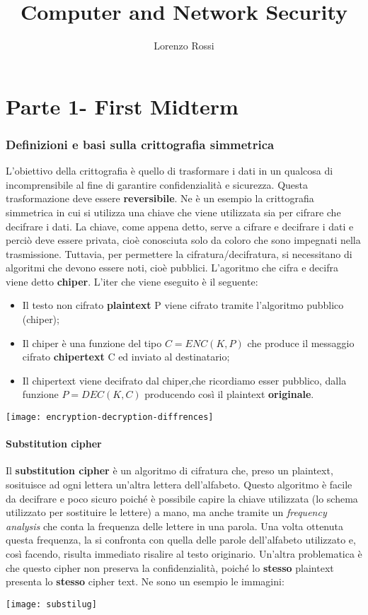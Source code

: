 \documentclass{article}
\title{Computer and Network Security}
\author{Lorenzo Rossi}
\theoremstyle{remark}
\begin{document}
\theoremstyle{definition}

\maketitle

\tableofcontents
\newpage
\part{Parte 1- First Midterm}
\section{Definizioni e basi sulla crittografia simmetrica}
L'obiettivo della crittografia è quello di trasformare i dati in un qualcosa di incomprensibile al fine di garantire confidenzialità e sicurezza. Questa trasformazione deve essere \textbf{reversibile}. Ne è un esempio la crittografia simmetrica in cui si utilizza una chiave che viene utilizzata sia per cifrare che decifrare i dati.
La chiave, come appena detto, serve a cifrare e decifrare i dati e perciò deve essere privata, cioè conosciuta solo da coloro che sono impegnati nella trasmissione. Tuttavia, per permettere la cifratura/decifratura, si necessitano di algoritmi che devono essere noti, cioè pubblici.
L'agoritmo che cifra e decifra viene detto \textbf{chiper}. L'iter che viene eseguito è il seguente:
\begin{itemize}
	\item Il testo non cifrato \textbf{plaintext} P viene cifrato tramite l'algoritmo pubblico (chiper);
	\item Il chiper è una funzione del tipo \(C=ENC(K,P)\) che produce il messaggio cifrato \textbf{chipertext} C ed inviato al destinatario;
	\item Il chipertext viene decifrato dal chiper,che ricordiamo esser pubblico, dalla funzione \(P=DEC(K,C)\) producendo così il plaintext \textbf{originale}.
\end{itemize}
\begin{center}
	\texttt{[image: encryption-decryption-diffrences]}
\end{center}
\subsection{Substitution cipher}
Il \textbf{substitution cipher} è un algoritmo di cifratura che, preso un plaintext, sosituisce ad ogni lettera un'altra lettera dell'alfabeto. Questo algoritmo è facile da decifrare e poco sicuro poiché è possibile capire la chiave utilizzata (lo schema utilizzato per sostituire le lettere) a mano, ma anche tramite un \emph{frequency analysis} che conta la frequenza delle lettere in una parola. Una volta ottenuta questa frequenza, la si confronta con quella delle parole dell'alfabeto utilizzato e, così facendo, risulta immediato risalire al testo originario.
Un'altra problematica è che questo cipher non preserva la confidenzialità, poiché lo \textbf{stesso} plaintext presenta lo \textbf{stesso} cipher text. Ne sono un esempio le immagini:
\begin{center}
	\texttt{[image: substilug]}
\end{center}
\end{document}
